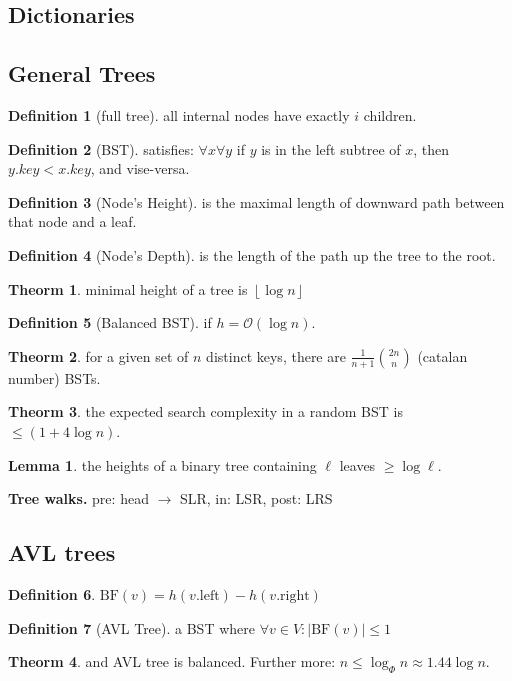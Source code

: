 \documentclass[]{article}
\newcommand\compactsubsection[1]        {\vspace{-10pt}\subsection{#1}\vspace{-5pt}}
\newcommand\compactsection   [1]        {\vspace{-10pt}\section{#1}\vspace{-5pt}}
\newcommand\subsectionrightaftersection {\vspace{10pt}}
\theoremstyle{definition}
\newtheorem{Theorem}{\color{theoColor}Theorm}
\newtheorem{Definition}{\color{defiColor}Definition}
\newtheorem{Lemma}{\color{lemColor}Lemma}
\newcommand\theo  [1] {\begin{Theorem}#1\end{Theorem}}
\newcommand\defi  [1] {\begin{Definition}#1\end{Definition}}
\newcommand\lem   [1] {\begin{Lemma}#1\end{Lemma}}
\newcommand\oc    {\mathcal{O}}
\newcommand\rf    {\right\rfloor}
\newcommand\lf    {\left\lfloor}
\newcommand\floor [1] {\lf #1 \rf}
\newcommand\co        {\colon}
\newcommand\logn      {\log n}
\newcommand\sof[1]    {\left | #1 \right |}
\begin{document}
\begin{multicols}{4}
		\compactsection{Dictionaries}\subsectionrightaftersection
			\compactsubsection{General Trees}
				\begin{Definition}[full tree]
					all internal nodes have exactly $i$ children. 
				\end{Definition}
				\begin{Definition}[BST]
					satisfies: $\forall x \forall y$ if $y$ is in the left subtree of $x$, then $y.key < x.key$, and vise-versa. 
				\end{Definition}
				\begin{Definition}[Node's Height]
					is the maximal length of downward path between that node and a leaf. 
				\end{Definition}
				\begin{Definition}[Node's Depth]
					is the length of the path up the tree to the root. 
				\end{Definition}
				\theo{minimal height of a tree is $\floor{\log n}$}
				\begin{Definition}[Balanced BST]
					if $h = \oc(\logn)$. 
				\end{Definition}
				\theo{for a given set of $n$ distinct keys, there are $\frac{1}{n + 1}\binom{2n}{n}$ (catalan number) BSTs. }
				\theo{the expected search complexity in a random BST is $\le (1 + 4 \logn)$. }
				\lem{the heights of a binary tree containing $\ell$ leaves $\ge \log \ell$. }
				
				\textbf{Tree walks. }pre: head $\to$ SLR, in: LSR, post: LRS
				
				
			\compactsubsection{AVL trees}
				\defi{$\mathrm{BF}(v) = h(v.\mathrm{left}) - h(v.\mathrm{right})$}
				\begin{Definition}[AVL Tree]
					a BST where $\forall v \in V \co \sof{\mathrm{BF}(v)} \le 1$
				\end{Definition}
				\theo{and AVL tree is balanced. Further more: $n \le \log_{\Phi}n \approx 1.44\logn$. }
				

\end{multicols}
\end{document}
